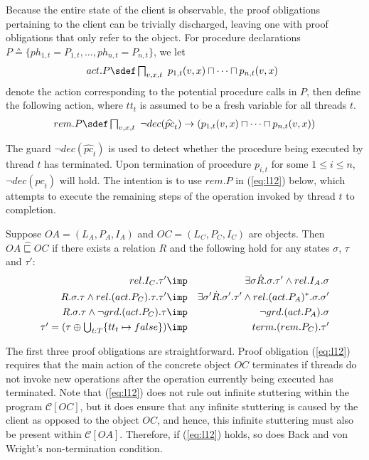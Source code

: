 \documentclass[11pt]{llncs}
\def \hpctvar{{\widehat{pc}_t}}
\def \srefc  {\mathbin{\widehat{\sqsubseteq}}}
\newcommand{\mcC}{\mathcal{C}}
\newcommand{\refeq}[1]{(\ref{#1})}
\newcommand{\refeqn}[1]{(\ref{#1})}
\begin{document}
Because the entire state of the client is observable, the proof
obligations pertaining to the client can be trivially discharged,
leaving one with proof obligations that only refer to the object.  For
procedure declarations
$P \sdef \{ph_{1,t} = P_{1,t}, \dots, ph_{n,t} = P_{n,t}\}$, we let 
\[
\begin{array}[t]{@{}ll@{}}
  act.P \sdef \textstyle\bigsqcap_{v, x, t}\
  p_{1,t}(v,x) \sqcap \dots \sqcap p_{n,t}(v,x)
\end{array}
\]
denote the action corresponding to the potential procedure calls in
$P$, then define the following action, where $tt_t$ is assumed to be a
fresh variable for all threads $t$.
\[
rem.P \sdef \textstyle\bigsqcap_{v, x, t}\ \neg dec(\hpctvar) \to
\begin{array}[t]{@{}l@{}}
  (p_{1,t}(v,x) \sqcap \dots \sqcap p_{n,t}(v,x))
\end{array}
\]

The guard $\neg dec(\hpctvar)$ is used to detect whether the procedure
being executed by thread $t$ has terminated. Upon termination of
procedure $p_{i,t}$ for some $1 \le i \le n$, $\neg dec(\hpctvar)$
will hold. The intention is to use $rem.P$ in \refeqn{eq:l12} below,
which attempts to execute the remaining steps of the operation invoked
by thread $t$ to completion.



\begin{lemma} 
  \label{lem:co-fsim}
  Suppose $OA = (L_A, P_A, I_A)$ and $OC = (L_C, P_C, I_C)$ are
  objects. Then $OA \srefc OC$ if there exists a relation $R$ and the
  following hold for any states $\sigma$, $\tau$ and $\tau'$:
\vspace{-2mm}
  \begin{eqnarray}
    \label{eq:l9}
    rel.I_C.\tau' & \imp & \exists \sigma \dot
    R.\sigma.\tau'  \land
    rel.I_A.\sigma
    \\
    \label{eq:l10-s}
    R.\sigma.\tau \land rel.(act.P_C).\tau.\tau' &
    \imp & \exists \sigma' \dot R.\sigma'.\tau' \land
    rel.(act.P_A)^*.\sigma.\sigma'
\\
    \label{eq:l11} 
    R.\sigma.\tau \land \neg grd.(act.P_C).\tau & \imp & \neg
    grd.(act.P_A).\sigma
    \\
    \label{eq:l12}
    \begin{array}[b]{@{}r@{}}
\tau' = (\tau \oplus \textstyle \bigcup_{t:T}
      \{tt_t \mapsto false\})
    \end{array}
                  & \imp & term.(rem.P_C).\tau'  \end{eqnarray}
\end{lemma}
\noindent The first three proof obligations are straightforward. Proof
obligation \refeq{eq:l12} requires that the main action of the
concrete object $OC$ terminates if threads do not invoke new
operations after the operation currently being executed has
terminated. Note that \refeqn{eq:l12} does not rule out infinite
stuttering within the program $\mcC[OC]$, but it does ensure that any
infinite stuttering is caused by the client as opposed to the object
$OC$, and hence, this infinite stuttering must also be present within
$\mcC[OA]$. Therefore, if \refeq{eq:l12} holds, so does Back and von
Wright's non-termination condition.
\end{document}
